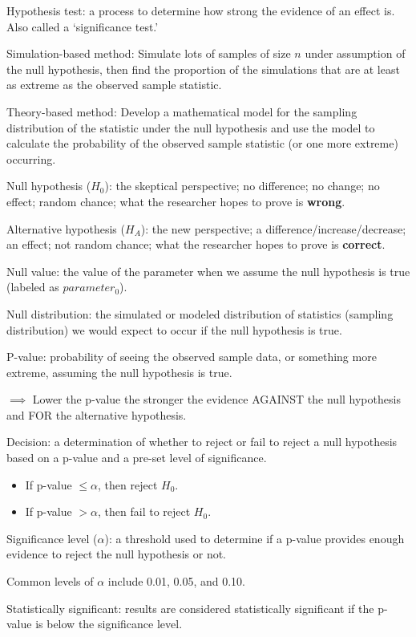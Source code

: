\documentclass[
]{report}
\newcommand{\rgi}{\hspace{24pt}}  %
\begin{document}
Hypothesis test: a process to determine how strong the evidence of an effect is. Also called a `significance test.'

Simulation-based method: Simulate lots of samples of size \(n\) under assumption of the null hypothesis, then find the proportion of the simulations that are at least as extreme as the observed sample statistic.

Theory-based method: Develop a mathematical model for the sampling distribution of the statistic under the null hypothesis and use the model to calculate the probability of the observed sample statistic (or one more extreme) occurring.

Null hypothesis (\(H_0\)): the skeptical perspective; no difference; no change; no effect; random chance; what the researcher hopes to prove is \textbf{wrong}.

Alternative hypothesis (\(H_A\)): the new perspective; a difference/increase/decrease; an effect; not random chance; what the researcher hopes to prove is \textbf{correct}.

Null value: the value of the parameter when we assume the null hypothesis is true (labeled as \(parameter_0\)).

Null distribution: the simulated or modeled distribution of statistics (sampling distribution) we would expect to occur if the null hypothesis is true.

P-value: probability of seeing the observed sample data, or something more extreme, assuming the null hypothesis is true.

\(\implies\) Lower the p-value the stronger the evidence AGAINST the null hypothesis and FOR the alternative hypothesis.

Decision: a determination of whether to reject or fail to reject a null hypothesis based on a p-value and a pre-set level of significance.

\begin{itemize}
\item
  If p-value \(\leq \alpha\), then reject \(H_0\).
\item
  If p-value \(> \alpha\), then fail to reject \(H_0\).
\end{itemize}

Significance level (\(\alpha\)): a threshold used to determine if a p-value provides enough evidence to reject the null hypothesis or not.

\rgi Common levels of \(\alpha\) include 0.01, 0.05, and 0.10.

Statistically significant: results are considered statistically significant if the p-value is below the significance level.
\end{document}
